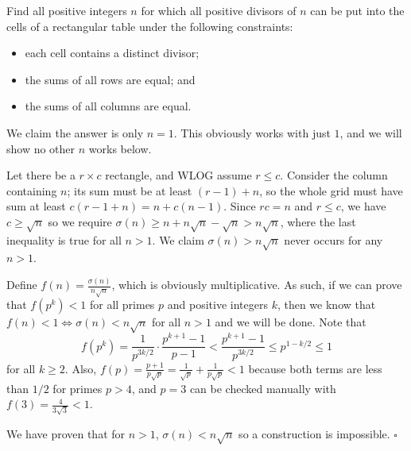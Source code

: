 
\begin{problem}[ISL 2016 C2]
    Find all positive integers $n$ for which all positive divisors of $n$ can be put into the cells of a rectangular table under the following constraints: \begin{itemize}
        \item each cell contains a distinct divisor;
        \item the sums of all rows are equal; and
        \item the sums of all columns are equal.
    \end{itemize}
\end{problem}

\begin{solution}
    We claim the answer is only $n = 1$. This obviously works with just $\boxed{1}$, and we will show no other $n$ works below.
    
    Let there be a $r \times c$ rectangle, and WLOG assume $r \leq c$. Consider the column containing $n$; its sum must be at least $(r-1) + n$, so the whole grid must have sum at least $c(r-1+n) = n + c(n-1)$. Since $rc = n$ and $r \leq c$, we have $c \geq \sqrt n$ so we require $\sigma(n) \geq n + n \sqrt n - \sqrt n > n \sqrt n$, where the last inequality is true for all $n > 1$. We claim $\sigma(n) > n \sqrt n$ never occurs for any $n > 1$.
    
    Define $f(n) = \tfrac{\sigma(n)}{n\sqrt n}$, which is obviously multiplicative. As such, if we can prove that $f(p^k) < 1$ for all primes $p$ and positive integers $k$, then we know that $f(n) < 1 \Longleftrightarrow \sigma(n) < n \sqrt n$ for all $n > 1$ and we will be done. Note that \[f(p^k) = \frac{1}{p^{3k/2}} \cdot \frac{p^{k+1}-1}{p-1} < \frac{p^{k+1}-1}{p^{3k/2}} \leq p^{1-k/2} \leq 1\] for all $k \geq 2$. Also, $f(p) = \tfrac{p+1}{p \sqrt p} = \frac{1}{\sqrt p} + \frac{1}{p \sqrt p} < 1$ because both terms are less than $1/2$ for primes $p > 4$, and $p=3$ can be checked manually with $f(3) = \tfrac{4}{3\sqrt3} < 1$.
    
    We have proven that for $n > 1$, $\sigma(n) < n \sqrt n$ so a construction is impossible. $\square$
\end{solution}
